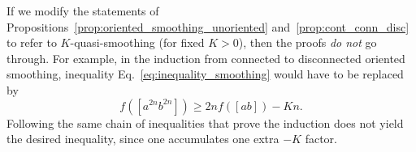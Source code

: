 \begin{remark}
If we modify the statements of
Propositions~\ref{prop:oriented_smoothing_unoriented}
and~\ref{prop:cont_conn_disc} to refer to $K$-quasi-smoothing (for fixed
$K>0$), then the proofs \emph{do not} go through. For example, in the
induction from connected to disconnected
oriented smoothing, inequality Eq.~\eqref{eq:inequality_smoothing} would
have to be replaced by
\[
f([a^{2n}b^{2n}]) \geq 2nf([ab]) - K n.
\]
Following the same chain of inequalities that prove the induction does
not yield the desired inequality, since one accumulates one extra $-K$
factor.
\end{remark}


